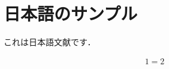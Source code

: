 \documentclass{ltjsarticle}
\begin{document}
\section{日本語のサンプル}

これは日本語文献です．

\begin{align*}
  1 = 2
\end{align*}
\end{document}
